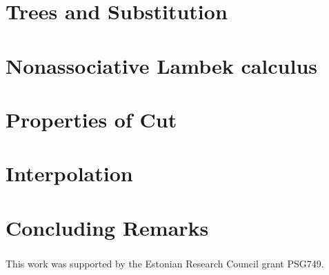 \documentclass[runningheads]{llncs}
\begin{document}
\section{Trees and Substitution}

\section{Nonassociative Lambek calculus}

\section{Properties of Cut}

\section{Interpolation}

\section{Concluding Remarks}

\begin{credits}
\subsubsection{\ackname} This work was supported by the Estonian Research Council grant PSG749. 

\end{credits}
%
%
%
% 
% 
%
\end{document}
